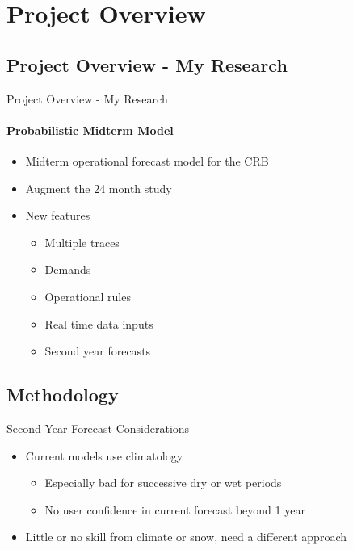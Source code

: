 \documentclass[xcolor=x11names,compress]{beamer}
\renewcommand{\(}{\begin{columns}}
\renewcommand{\)}{\end{columns}}
\newcommand{\<}[1]{\begin{column}{#1}}
\renewcommand{\>}{\end{column}}
\begin{document}
\section{Project Overview}
\subsection{Project Overview - My Research}
\begin{frame}{Project Overview - My Research}
\framesubtitle{Probabilistic Midterm Model}
\pause
\begin{itemize}
\item Midterm operational forecast model for the CRB
\item Augment the 24 month study
\item New features
	\begin{itemize}
	\item Multiple traces
	\item Demands 
	\item Operational rules
	\item Real time data inputs
	\item Second year forecasts
	\end{itemize}
\end{itemize}
\end{frame}

\subsection{Methodology}
\begin{frame}{Second Year Forecast Considerations}
\begin{itemize}
\item Current models use climatology
	\begin{itemize}
		\item Especially bad for successive dry or wet periods
		\item No user confidence in current forecast beyond 1 year
	\end{itemize}
\item Little or no skill from climate or snow, need a different approach
\end{itemize}
\end{frame}

\end{document}
